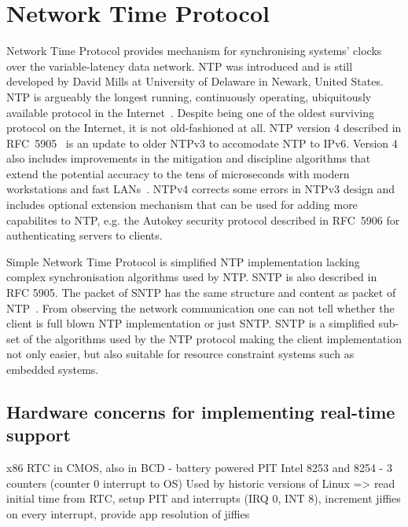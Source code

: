 
\chapter{Network Time Protocol}
Network Time Protocol provides mechanism for synchronising systems' clocks over the variable-latency data network.
NTP was introduced and is still developed by David Mills at University of Delaware in Newark, United States.
NTP is argueably the longest running, continuously operating,
ubiquitously available protocol in the Internet~\cite{ntp-overview}.
Despite being one of the oldest surviving protocol on the Internet, it is not old-fashioned at all.
NTP version 4 described in RFC~5905~\cite{rfc5905} is an update to older NTPv3 to accomodate NTP to IPv6.
Version 4 also includes improvements in
the mitigation and discipline algorithms that extend
the potential accuracy to the tens of microseconds with modern
workstations and fast LANs~\cite{rfc5905}.
NTPv4 corrects some
errors in NTPv3 design and includes optional extension mechanism
that can be used for adding more capabilites to NTP, e.g. the
Autokey security protocol described in RFC~5906
for authenticating servers to clients.

Simple Network Time Protocol is simplified NTP implementation lacking complex
synchronisation algorithms used by NTP.
SNTP is also described in RFC 5905.
The packet of SNTP has the same structure and content as packet of NTP~\cite{rfc5905}.
From observing the network communication one can not tell whether the client
is full blown NTP implementation or just SNTP.
SNTP is a simplified sub-set of the algorithms used by the NTP protocol
making the client implementation not only easier, but also suitable for
resource constraint systems such as embedded systems.











\section{Hardware concerns for implementing real-time support}
x86
RTC in CMOS, also in BCD - battery powered
PIT Intel 8253 and 8254 - 3 counters (counter 0 interrupt to OS)
Used by historic versions of Linux
=> read initial time from RTC, setup PIT and interrupts (IRQ 0, INT 8), increment jiffies on every interrupt, provide app resolution of jiffies

